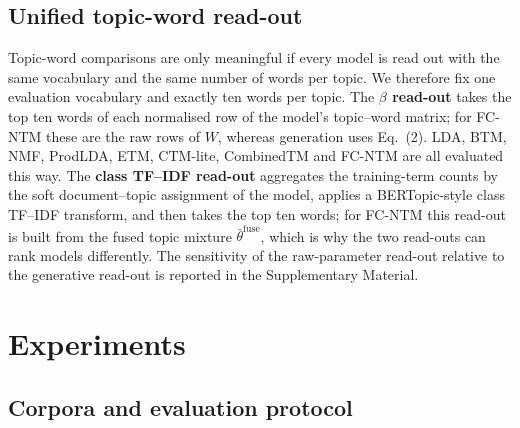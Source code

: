 \documentclass{article}
\begin{document}
\subsection{Unified topic-word read-out}
\label{sec:readout}

Topic-word comparisons are only meaningful if every model is read out with the same vocabulary and
the same number of words per topic. We therefore fix one evaluation vocabulary and exactly ten
words per topic. The \textbf{$\beta$ read-out} takes the top ten words of each normalised row of
the model's topic--word matrix; for FC-NTM these are the raw rows of $W$, whereas generation
uses Eq.~(2). LDA, BTM, NMF, ProdLDA, ETM, CTM-lite, CombinedTM and FC-NTM are all
evaluated this way. The \textbf{class TF--IDF read-out} aggregates the training-term counts by the
soft document--topic assignment of the model, applies a BERTopic-style class TF--IDF transform,
and then takes the top ten words; for FC-NTM this read-out is built from the fused topic mixture
$\bar\theta^{\mathrm{fuse}}$, which is why the two read-outs can rank models differently. The
sensitivity of the raw-parameter read-out relative to the generative read-out is reported in the
Supplementary Material.

\section{Experiments}

\subsection{Corpora and evaluation protocol}
\end{document}
